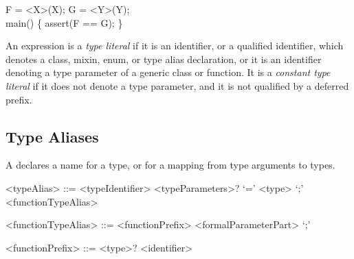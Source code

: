 \documentclass[makeidx]{article}
\begin{document}
{

\begin{dartCode}
\TYPEDEF{} F = \VOID{} \FUNCTION{}<X>(X);
\TYPEDEF{} G = \VOID{} \FUNCTION{}<Y>(Y);
\\
\VOID{} main() \{
  assert(F == G);
\}
\end{dartCode}

\LMHash{}%

\LMHash{}%
An expression is a \emph{type literal} if it is an identifier,
or a qualified identifier,
which denotes a class, mixin, enum, or type alias declaration, or it is
an identifier denoting a type parameter of a generic class or function.
It is a \emph{constant type literal} if it does not denote a type parameter,
and it is not qualified by a deferred prefix.


\subsection{Type Aliases}

\LMHash{}%
A  declares a name for a type,
or for a mapping from type arguments to types.


\begin{grammar}
<typeAlias> ::= \gnewline{}
  \TYPEDEF{} <typeIdentifier> <typeParameters>? `=' <type> `;'
  \alt \TYPEDEF{} <functionTypeAlias>

<functionTypeAlias> ::= <functionPrefix> <formalParameterPart> `;'

<functionPrefix> ::= <type>? <identifier>
\end{grammar}

}
\end{document}
